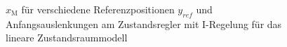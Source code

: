 \begin{figure}[H]
    \centering
    \caption[$x_{\mathrm{M}}$ für Regler mit I-Regelung (linear)]{$x_{\mathrm{M}}$ für verschiedene Referenzpositionen $y_{ref}$ und Anfangsauslenkungen am Zustandsregler mit I-Regelung für das lineare Zustandsraummodell}
    \label{fig:Bild23}
\end{figure}

